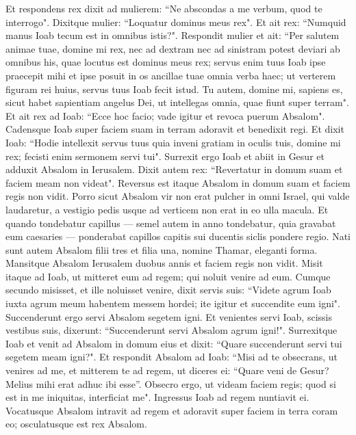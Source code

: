 \begin{biblechapter}
\verse Et respondens rex dixit ad mulierem: “Ne abscondas a me verbum, quod te interrogo". Dixitque mulier: “Loquatur dominus meus rex". 
\verse Et ait rex: “Numquid manus Ioab tecum est in omnibus istis?". Respondit mulier et ait: “Per salutem animae tuae, domine mi rex, nec ad dextram nec ad sinistram potest deviari ab omnibus his, quae locutus est dominus meus rex; servus enim tuus Ioab ipse praecepit mihi et ipse posuit in os ancillae tuae omnia verba haec; 
\verse ut verterem figuram rei huius, servus tuus Ioab fecit istud. Tu autem, domine mi, sapiens es, sicut habet sapientiam angelus Dei, ut intellegas omnia, quae fiunt super terram". 
\verse Et ait rex ad Ioab: “Ecce hoc facio; vade igitur et revoca puerum Absalom".  
\verse Cadensque Ioab super faciem suam in terram adoravit et benedixit regi. Et dixit Ioab: “Hodie intellexit servus tuus quia inveni gratiam in oculis tuis, domine mi rex; fecisti enim sermonem servi tui". 
\verse Surrexit ergo Ioab et abiit in Gesur et adduxit Absalom in Ierusalem. 
\verse Dixit autem rex: “Revertatur in domum suam et faciem meam non videat". Reversus est itaque Absalom in domum suam et faciem regis non vidit. 
\verse Porro sicut Absalom vir non erat pulcher in omni Israel, qui valde laudaretur, a vestigio pedis usque ad verticem non erat in eo ulla macula.  
\verse Et quando tondebatur capillus — semel autem in anno tondebatur, quia gravabat eum caesaries — ponderabat capillos capitis sui ducentis siclis pondere regio.  
\verse Nati sunt autem Absalom filii tres et filia una, nomine Thamar, eleganti forma. 
\verse Mansitque Absalom Ierusalem duobus annis et faciem regis non vidit. 
\verse Misit itaque ad Ioab, ut mitteret eum ad regem; qui noluit venire ad eum. Cumque secundo misisset, et ille noluisset venire, 
\verse dixit servis suis: “Videte agrum Ioab iuxta agrum meum habentem messem hordei; ite igitur et succendite eum igni". Succenderunt ergo servi Absalom segetem igni. Et venientes servi Ioab, scissis vestibus suis, dixerunt: “Succenderunt servi Absalom agrum igni!". 
\verse Surrexitque Ioab et venit ad Absalom in domum eius et dixit: “Quare succenderunt servi tui segetem meam igni?". 
\verse Et respondit Absalom ad Ioab: “Misi ad te obsecrans, ut venires ad me, et mitterem te ad regem, ut diceres ei: “Quare veni de Gesur? Melius mihi erat adhuc ibi esse”. Obsecro ergo, ut videam faciem regis; quod si est in me iniquitas, interficiat me".  
\verse Ingressus Ioab ad regem nuntiavit ei. Vocatusque Absalom intravit ad regem et adoravit super faciem in terra coram eo; osculatusque est rex Absalom. 
\end{biblechapter}

